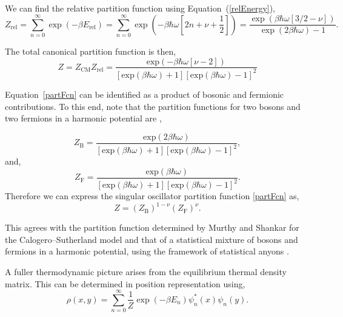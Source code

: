 \documentclass[preprints,article,accept,moreauthors,pdftex]{Definitions/mdpi}
\begin{document}
We can find the relative partition function using Equation~(\ref{relEnergy}),
\begin{equation}
	Z_{\mathrm{rel}} = \sum_{n = 0}^{\infty}\exp(-\beta E_{\mathrm{rel}}) = \sum_{n = 0}^{\infty} \exp\left(-\beta \hbar \omega \left[2n+\nu+\frac{1}{2}\right]\right) = \frac{\exp\left(\beta \hbar \omega[3/2- \nu ] \right)}{\exp\left(2 \beta \hbar  \omega  \right)-1}. 
\end{equation}

The total canonical partition function is then, 
\begin{equation}
	\label{partFcn}
	Z = Z_{\mathrm{CM}}Z_{\mathrm{rel}} = \frac{\mathrm{exp}(-\beta \hbar \omega [\nu-2])}{[\mathrm{exp}(\beta \hbar \omega)+1][\mathrm{exp}(\beta \hbar \omega)-1]^2} 
\end{equation}

Equation~\eqref{partFcn} can be identified as a product of bosonic and fermionic contributions.  To this end, note that the partition functions for two bosons and two fermions in a harmonic potential are \cite{Myers2021},

\vspace{-3pt}
\begin{equation}
	Z_{\mathrm{B}} = \frac{\mathrm{exp}(2 \beta \hbar \omega)}{[\mathrm{exp}(\beta \hbar \omega)+1][\mathrm{exp}(\beta \hbar \omega)-1]^2},
\end{equation}
and,
\begin{equation}
	Z_{\mathrm{F}} = \frac{\mathrm{exp}(\beta \hbar \omega)}{[\mathrm{exp}(\beta \hbar \omega)+1][\mathrm{exp}(\beta \hbar \omega)-1]^2}.
\end{equation}
Therefore we can express the singular oscillator partition function \eqref{partFcn} as,
\begin{equation}
	Z = \left(Z_{\mathrm{B}}\right)^{1-\nu}\left(Z_{\mathrm{F}}\right)^{\nu}.
\end{equation}

This agrees with the partition function determined by Murthy and Shankar for the Calogero--Sutherland model \cite{Murthy1994} and that of a statistical mixture of bosons and fermions in a harmonic potential, using the framework of statistical anyons \cite{Myers2021}. 

A fuller thermodynamic picture arises from the equilibrium thermal density matrix. This can be determined in position representation using,
\begin{equation}
	\label{DenForm}
	\rho(x,y) = \sum_{n = 0}^{\infty} \frac{1}{Z} \exp(-\beta E_n)\psi_n^*(x)\psi_n(y).
\end{equation}
\end{document}
